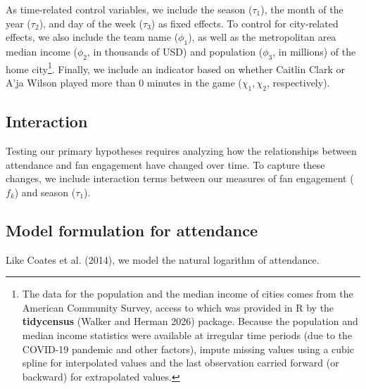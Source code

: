 \documentclass[
  letterpaper,
  DIV=11,
  numbers=noendperiod]{scrartcl}
\begin{document}
As time-related control variables, we include the season (\(\tau_1\)),
the month of the year (\(\tau_2\)), and day of the week (\(\tau_3\)) as
fixed effects. To control for city-related effects, we also include the
team name (\(\phi_1\)), as well as the metropolitan area median income
(\(\phi_2\), in thousands of USD) and population (\(\phi_3\), in
millions) of the home city\footnote{The data for the population and the
  median income of cities comes from the American Community Survey,
  access to which was provided in R by the \textbf{tidycensus} (Walker
  and Herman 2026) package. Because the population and median income
  statistics were available at irregular time periods (due to the
  COVID-19 pandemic and other factors), impute missing values using a
  cubic spline for interpolated values and the last observation carried
  forward (or backward) for extrapolated values.}. Finally, we include
an indicator based on whether Caitlin Clark or A'ja Wilson played more
than 0 minutes in the game (\(\chi_1, \chi_2\), respectively).

\subsection{Interaction}\label{interaction}

Testing our primary hypotheses requires analyzing how the relationships
between attendance and fan engagement have changed over time. To capture
these changes, we include interaction terms between our measures of fan
engagement (\(f_k\)) and season (\(\tau_1\)).

\subsection{Model formulation for attendance}\label{sec-mod-attend}

Like Coates et al. (2014), we model the natural logarithm of attendance.
\end{document}
